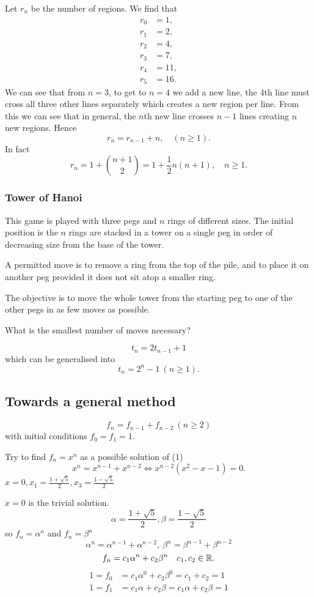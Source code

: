 \documentclass[10pt, a4paper]{article}
\begin{document}
Let $r_n$ be the number of regions.
We find that
\begin{align*}
    r_0 &= 1, \\
    r_1 &= 2, \\
    r_2 &= 4, \\
    r_3 &= 7, \\
    r_4 &= 11, \\
    r_5 &= 16.
\end{align*}
We can see that from $n = 3$,
to get to $n = 4$ we add a new line,
the $4$th line must cross all three other lines separately which creates a new region per line.
From this we can see that in general,
the $n$th new line crosses $n - 1$ lines creating $n$ new regions.
Hence
\[
r_n = r_{n - 1} + n,\quad(n \geq 1).
\]
In fact
\[
r_n = 1 + \binom{n + 1}{2} = 1 + \frac{1}{2}n(n + 1),\quad n \geq 1.
\]

\subsubsection{Tower of Hanoi}
This game is played with three pegs and $n$ rings of different sizes.
The initial position is the $n$ rings are stacked in a tower on a single peg in order of decreasing size from the base of the tower.

A permitted move is to remove a ring from the top of the pile,
and to place it on another peg provided it does not sit atop a smaller ring.

The objective is to move the whole tower from the starting peg to one of the other pegs in as few moves as possible.

What is the smallest number of moves necessary?

\[
t_n = 2t_{n - 1} + 1
\]
which can be generalised into
\[
t_n = 2 ^ n - 1\ (n \geq 1).
\]

\subsection{Towards a general method}
\begin{equation}
    f_n = f_{n - 1} + f_{n - 2}\ (n \geq 2)
\end{equation}
with initial conditions $f_0 = f_1 = 1$.

Try to find $f_n = x ^ n$ as a possible solution of (1)
\[
x ^ n = x ^ {n - 1} + x ^ {n - 2} \iff x ^ {n - 2}(x ^ 2 - x - 1) = 0.
\]
$x = 0, x_1 = \frac{1 + \sqrt{5}}{2}, x_3 = \frac{1 - \sqrt{5}}{2}$

$x = 0$ is the trivial solution.
\[
\alpha = \frac{1 + \sqrt{5}}{2}, \beta = \frac{1 - \sqrt{5}}{2}
\]
so
$f_n = \alpha ^ n$ and $f_n = \beta ^ n$
\[
\alpha ^ n = \alpha ^ {n - 1} + \alpha ^ {n - 2},\ \beta ^ n = \beta ^ {n - 1} + \beta ^ {n - 2}
\]
\[
f_n = c_1\alpha ^ n + c_2\beta ^ n\quad c_1, c_2 \in \mathbb{R}.
\]
\begin{align*}
    1 = f_0 &= c_1\alpha ^ 0 + c_2\beta ^ 0 = c_1 + c_2 = 1 \\
    1 = f_1 &= c_1\alpha + c_2\beta = c_1\alpha + c_2\beta = 1
\end{align*}
\end{document}
